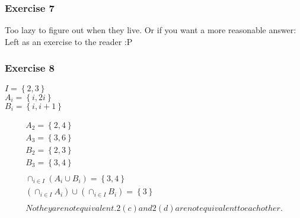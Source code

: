 \begin{questions}
\subsubsection{Exercise 7}
Too lazy to figure out when they live.
Or if you want a more reasonable answer: Left as an exercise to the reader :P
\subsubsection{Exercise 8}
\begin{center}
  $I = \left\{2,3\right\}$ \\
  $A_i = \left\{ i,2i \right\}$ \\
  $B_i = \left\{ i, i + 1 \right\}$ \\
\end{center}
\begin{align*}
  A_2 = \left\{ 2, 4 \right\} \\
  A_3 = \left\{ 3, 6 \right\} \\
  B_2 = \left\{ 2, 3 \right\} \\
  B_3 = \left\{ 3, 4 \right\} \\ \\
  \cap_{i \in I}(A_i \cup B_i) = \left\{3,4 \right\} \\
  (\cap_{i \in I}A_i) \cup (\cap_{i \in I}B_i) = \left\{ 3\right\} \\ \\
  No they are not equivalent. 2(c) and 2(d) are not equivalent to each other.
\end{align*}


\end{questions}
